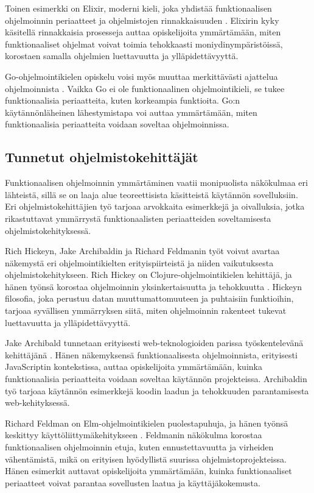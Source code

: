 Toinen esimerkki on Elixir, moderni kieli, joka yhdistää funktionaalisen ohjelmoinnin periaatteet ja ohjelmistojen rinnakkaisuuden \cite{elixir}. Elixirin kyky käsitellä rinnakkaisia prosesseja auttaa opiskelijoita ymmärtämään, miten funktionaaliset ohjelmat voivat toimia tehokkaasti moniydinympäristöissä, korostaen samalla ohjelmien luettavuutta ja ylläpidettävyyttä.

Go-ohjelmointikielen opiskelu voisi myös muuttaa merkittävästi ajattelua ohjelmoinnista \cite{golang}. Vaikka Go ei ole funktionaalinen ohjelmointikieli, se tukee funktionaalisia periaatteita, kuten korkeampia funktioita. Go:n käytännönläheinen lähestymistapa voi auttaa ymmärtämään, miten funktionaalisia periaatteita voidaan soveltaa ohjelmoinnissa.

\subsection{Tunnetut ohjelmistokehittäjät}

Funktionaalisen ohjelmoinnin ymmärtäminen vaatii monipuolista näkökulmaa eri lähteistä, sillä se on laaja alue teoreettisista käsitteistä käytännön sovelluksiin. Eri ohjelmistokehittäjien työ tarjoaa arvokkaita esimerkkejä ja oivalluksia, jotka rikastuttavat ymmärrystä funktionaalisten periaatteiden soveltamisesta ohjelmistokehityksessä.

Rich Hickeyn, Jake Archibaldin ja Richard Feldmanin työt voivat avartaa näkemystä eri ohjelmointikielten erityispiirteistä ja niiden vaikutuksesta ohjelmistokehitykseen. Rich Hickey on Clojure-ohjelmointikielen kehittäjä, ja hänen työnsä korostaa ohjelmoinnin yksinkertaisuutta ja tehokkuutta \cite{hickey_maybe_not,hickey_persistent_2009}. Hickeyn filosofia, joka perustuu datan muuttumattomuuteen ja puhtaisiin funktioihin, tarjoaa syvällisen ymmärryksen siitä, miten ohjelmoinnin rakenteet tukevat luettavuutta ja ylläpidettävyyttä.

Jake Archibald tunnetaan erityisesti web-teknologioiden parissa työskentelevänä kehittäjänä \cite{against_self_closing_tags,is_reduce_bad}. Hänen näkemyksensä funktionaalisesta ohjelmoinnista, erityisesti JavaScriptin kontekstissa, auttaa opiskelijoita ymmärtämään, kuinka funktionaalisia periaatteita voidaan soveltaa käytännön projekteissa. Archibaldin työ tarjoaa käytännön esimerkkejä koodin laadun ja tehokkuuden parantamisesta web-kehityksessä.

Richard Feldman on Elm-ohjelmointikielen puolestapuhuja, ja hänen työnsä keskittyy käyttöliittymäkehitykseen \cite{feldman_fp_pragmatists,impossiblebetter}. Feldmanin näkökulma korostaa funktionaalisen ohjelmoinnin etuja, kuten ennustettavuutta ja virheiden vähentämistä, mikä on erityisen hyödyllistä suurissa ohjelmistoprojekteissa. Hänen esimerkit auttavat opiskelijoita ymmärtämään, kuinka funktionaaliset periaatteet voivat parantaa sovellusten laatua ja käyttäjäkokemusta.

